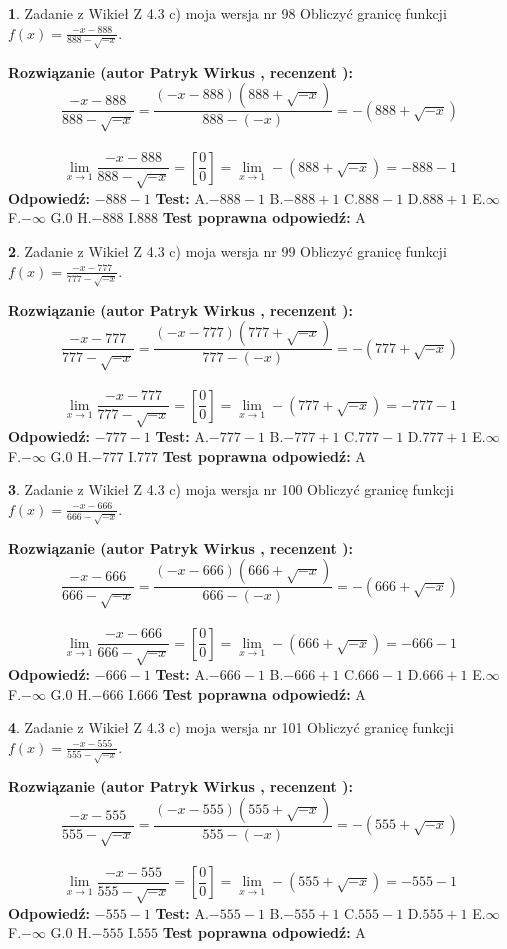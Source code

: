 \documentclass[12pt, a4paper]{article}
\theoremstyle{definition} %
\newtheorem{zad}{}
\newcommand{\zadStart}[1]{\begin{zad}#1\newline}
\newcommand{\zadStop}{\end{zad}}
\newcommand{\rozwStart}[2]{\noindent \textbf{Rozwiązanie (autor #1 , recenzent #2): }\newline}
\newcommand{\rozwStop}{\newline}
\newcommand{\odpStart}{\noindent \textbf{Odpowiedź:}\newline}
\newcommand{\odpStop}{\newline}
\newcommand{\testStart}{\noindent \textbf{Test:}\newline}
\newcommand{\testStop}{\newline}
\newcommand{\kluczStart}{\noindent \textbf{Test poprawna odpowiedź:}\newline}
\newcommand{\kluczStop}{\newline}
\begin{document}
\zadStart{Zadanie z Wikieł Z 4.3 c) moja wersja nr 98}
Obliczyć granicę funkcji $f(x)=\frac{-x-888}{888-\sqrt{-x}}$.
\zadStop
\rozwStart{Patryk Wirkus}{}
$$\frac{-x-888}{888-\sqrt{-x}}=\frac{(-x-888)(888+\sqrt{-x})}{888-(-x)}=-(888+\sqrt{-x})$$
\\
$$\lim\limits_{x\to1}\frac{-x-888}{888-\sqrt{-x}}=[\frac{0}{0}]=\lim\limits_{x\to1}-(888+\sqrt{-x}) =-888-1$$
\rozwStop
\odpStart
$-888-1$
\odpStop
\testStart
A.$-888-1$
B.$-888+1$
C.$888-1$
D.$888+1$
E.$\infty$
F.$-\infty$
G.$0$
H.$-888$
I.$888$
\testStop
\kluczStart
A
\kluczStop



\zadStart{Zadanie z Wikieł Z 4.3 c) moja wersja nr 99}
Obliczyć granicę funkcji $f(x)=\frac{-x-777}{777-\sqrt{-x}}$.
\zadStop
\rozwStart{Patryk Wirkus}{}
$$\frac{-x-777}{777-\sqrt{-x}}=\frac{(-x-777)(777+\sqrt{-x})}{777-(-x)}=-(777+\sqrt{-x})$$
\\
$$\lim\limits_{x\to1}\frac{-x-777}{777-\sqrt{-x}}=[\frac{0}{0}]=\lim\limits_{x\to1}-(777+\sqrt{-x}) =-777-1$$
\rozwStop
\odpStart
$-777-1$
\odpStop
\testStart
A.$-777-1$
B.$-777+1$
C.$777-1$
D.$777+1$
E.$\infty$
F.$-\infty$
G.$0$
H.$-777$
I.$777$
\testStop
\kluczStart
A
\kluczStop



\zadStart{Zadanie z Wikieł Z 4.3 c) moja wersja nr 100}
Obliczyć granicę funkcji $f(x)=\frac{-x-666}{666-\sqrt{-x}}$.
\zadStop
\rozwStart{Patryk Wirkus}{}
$$\frac{-x-666}{666-\sqrt{-x}}=\frac{(-x-666)(666+\sqrt{-x})}{666-(-x)}=-(666+\sqrt{-x})$$
\\
$$\lim\limits_{x\to1}\frac{-x-666}{666-\sqrt{-x}}=[\frac{0}{0}]=\lim\limits_{x\to1}-(666+\sqrt{-x}) =-666-1$$
\rozwStop
\odpStart
$-666-1$
\odpStop
\testStart
A.$-666-1$
B.$-666+1$
C.$666-1$
D.$666+1$
E.$\infty$
F.$-\infty$
G.$0$
H.$-666$
I.$666$
\testStop
\kluczStart
A
\kluczStop



\zadStart{Zadanie z Wikieł Z 4.3 c) moja wersja nr 101}
Obliczyć granicę funkcji $f(x)=\frac{-x-555}{555-\sqrt{-x}}$.
\zadStop
\rozwStart{Patryk Wirkus}{}
$$\frac{-x-555}{555-\sqrt{-x}}=\frac{(-x-555)(555+\sqrt{-x})}{555-(-x)}=-(555+\sqrt{-x})$$
\\
$$\lim\limits_{x\to1}\frac{-x-555}{555-\sqrt{-x}}=[\frac{0}{0}]=\lim\limits_{x\to1}-(555+\sqrt{-x}) =-555-1$$
\rozwStop
\odpStart
$-555-1$
\odpStop
\testStart
A.$-555-1$
B.$-555+1$
C.$555-1$
D.$555+1$
E.$\infty$
F.$-\infty$
G.$0$
H.$-555$
I.$555$
\testStop
\kluczStart
A
\kluczStop
\end{document}
